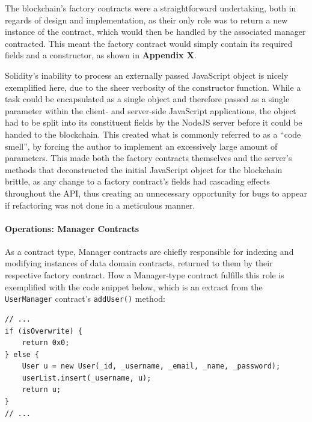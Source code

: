 The blockchain's factory contracts were a straightforward undertaking,
both in regards of design and implementation, as their only role was to
return a new instance of the contract, which would then be handled by
the associated manager contracted. This meant the factory contract would
simply contain its required fields and a constructor, as shown in
\textbf{Appendix X}.

Solidity's inability to process an externally passed JavaScript object
is nicely exemplified here, due to the sheer verbosity of the
constructor function. While a task could be encapsulated as a single
object and therefore passed as a single parameter within the client- and
server-side JavaScript applications, the object had to be split into its
constituent fields by the NodeJS server before it could be handed to the
blockchain. This created what is commonly referred to as a ``code
smell''\cite{tufano2015codesmell}, by forcing the author to
implement an excessively large amount of parameters. This made both the
factory contracts themselves and the server's methods that deconstructed
the initial JavaScript object for the blockchain brittle, as any change
to a factory contract's fields had cascading effects throughout the API,
thus creating an unnecessary opportunity for bugs to appear if
refactoring was not done in a meticulous manner.

\paragraph{Operations: Manager
Contracts}\label{operations-manager-contracts}

As a contract type, Manager contracts are chiefly responsible for
indexing and modifying instances of data domain contracts, returned to
them by their respective factory contract. How a Manager-type contract
fulfills this role is exemplified with the code snippet below, which is
an extract from the \texttt{UserManager} contract's \texttt{addUser()}
method:

\begin{verbatim}
// ...
if (isOverwrite) {
    return 0x0;
} else {
    User u = new User(_id, _username, _email, _name, _password);
    userList.insert(_username, u);
    return u;
}
// ...
\end{verbatim}


